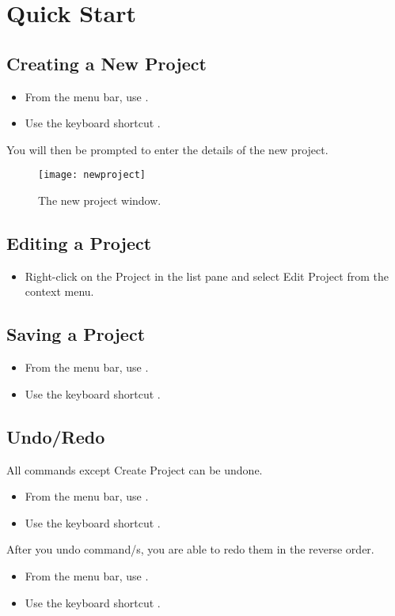 \documentclass[11pt,fleqn]{book} %
\begin{document}
\section{Quick Start}
\subsection{Creating a New Project}
\begin{itemize}
  \item From the menu bar, use .
  \item Use the keyboard shortcut .
\end{itemize}
You will then be prompted to enter the details of the new project.

\begin{figure}[h]
  \centering
  \texttt{[image: newproject]}
  \caption{The new project window.\label{newproject}}
\end{figure}

\subsection{Editing a Project}
\begin{itemize}
  \item Right-click on the Project in the list pane and select Edit Project from the context menu.
\end{itemize}

\subsection{Saving a Project}
\begin{itemize}
  \item From the menu bar, use .
  \item Use the keyboard shortcut .
\end{itemize}

\subsection{Undo/Redo}
All commands except Create Project can be undone.
\begin{itemize}
  \item From the menu bar, use .
  \item Use the keyboard shortcut .
\end{itemize}
After you undo command/s, you are able to redo them in the reverse order.
\begin{itemize}
  \item From the menu bar, use .
  \item Use the keyboard shortcut .
\end{itemize}
\end{document}
